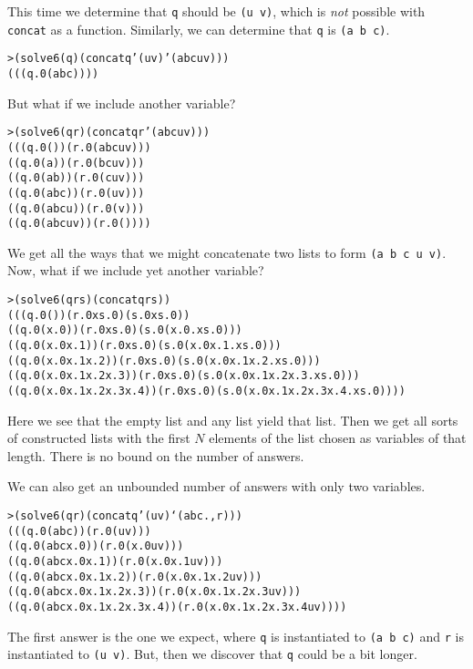 \noindent
This time we determine that \texttt{q} should be \texttt{(u v)}, which
is \emph{not} possible with \texttt{concat} as a function.
Similarly, we can determine that \texttt{q} is \texttt{(a b c)}.

\begin{alltt}
> (solve 6 (q) (concat q '(u v) '(a b c u v)))
(((q.0 (a b c))))
\end{alltt}

\noindent
But what if we include another variable?
\begin{alltt}
> (solve 6 (q r) (concat q r '(a b c u v)))
(((q.0 ()) (r.0 (a b c u v)))
 ((q.0 (a)) (r.0 (b c u v)))
 ((q.0 (a b)) (r.0 (c u v)))
 ((q.0 (a b c)) (r.0 (u v)))
 ((q.0 (a b c u)) (r.0 (v)))
 ((q.0 (a b c u v)) (r.0 ())))
\end{alltt}

\noindent
We get all the ways that we might concatenate
two lists to form \texttt{(a b c u v)}.
Now, what if we include yet another variable?

\begin{alltt}
> (solve 6 (q r s) (concat q r s))
(((q.0 ()) (r.0 xs.0) (s.0 xs.0))
 ((q.0 (x.0)) (r.0 xs.0) (s.0 (x.0 . xs.0)))
 ((q.0 (x.0 x.1)) (r.0 xs.0) (s.0 (x.0 x.1 . xs.0)))
 ((q.0 (x.0 x.1 x.2)) (r.0 xs.0) (s.0 (x.0 x.1 x.2 . xs.0)))
 ((q.0 (x.0 x.1 x.2 x.3)) (r.0 xs.0) (s.0 (x.0 x.1 x.2 x.3 . xs.0)))
 ((q.0 (x.0 x.1 x.2 x.3 x.4)) (r.0 xs.0) (s.0 (x.0 x.1 x.2 x.3 x.4 . xs.0))))
\end{alltt}

\noindent
Here we see that the empty list and any list yield that list.  Then we
get all sorts of constructed lists with the first $N$ elements of the
list chosen as variables of that length.  There is no bound on the
number of answers.

We can also get an unbounded number of answers with only two variables.

\begin{alltt}
> (solve 6 (q r) (concat q '(u v) `(a b c . ,r)))
(((q.0 (a b c)) (r.0 (u v)))
 ((q.0 (a b c x.0)) (r.0 (x.0 u v)))
 ((q.0 (a b c x.0 x.1)) (r.0 (x.0 x.1 u v)))
 ((q.0 (a b c x.0 x.1 x.2)) (r.0 (x.0 x.1 x.2 u v)))
 ((q.0 (a b c x.0 x.1 x.2 x.3)) (r.0 (x.0 x.1 x.2 x.3 u v)))
 ((q.0 (a b c x.0 x.1 x.2 x.3 x.4)) (r.0 (x.0 x.1 x.2 x.3 x.4 u v))))
\end{alltt}

\noindent
The first answer is the one we expect, where \texttt{q} is
instantiated to \texttt{(a b c)} and \texttt{r} is instantiated to
\texttt{(u v)}.  But, then we discover that \texttt{q} could be a bit
longer.

